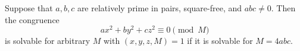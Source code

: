 \begin{proposition}
Suppose that $a,b,c$ are relatively prime in pairs, square-free, and $abc\ne0$.
Then the congruence
\[
    ax^2+by^2+cz^2\equiv0\pmod M
\]
is solvable for arbitrary $M$ with $(x,y,z,M)=1$ if it is solvable for $M=4abc$.
\end{proposition}
